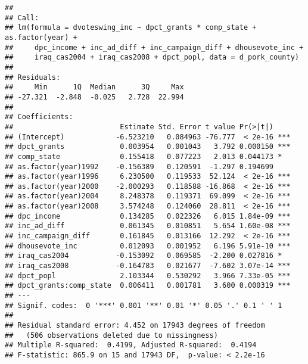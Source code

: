 \documentclass[
]{article}
\begin{document}
\begin{verbatim}
## 
## Call:
## lm(formula = dvoteswing_inc ~ dpct_grants * comp_state + as.factor(year) + 
##     dpc_income + inc_ad_diff + inc_campaign_diff + dhousevote_inc + 
##     iraq_cas2004 + iraq_cas2008 + dpct_popl, data = d_pork_county)
## 
## Residuals:
##     Min      1Q  Median      3Q     Max 
## -27.321  -2.848  -0.025   2.728  22.994 
## 
## Coefficients:
##                         Estimate Std. Error t value Pr(>|t|)    
## (Intercept)            -6.523210   0.084963 -76.777  < 2e-16 ***
## dpct_grants             0.003954   0.001043   3.792 0.000150 ***
## comp_state              0.155418   0.077223   2.013 0.044173 *  
## as.factor(year)1992    -0.156389   0.120591  -1.297 0.194699    
## as.factor(year)1996     6.230500   0.119533  52.124  < 2e-16 ***
## as.factor(year)2000    -2.000293   0.118588 -16.868  < 2e-16 ***
## as.factor(year)2004     8.248378   0.119371  69.099  < 2e-16 ***
## as.factor(year)2008     3.574248   0.124060  28.811  < 2e-16 ***
## dpc_income              0.134285   0.022326   6.015 1.84e-09 ***
## inc_ad_diff             0.061345   0.010851   5.654 1.60e-08 ***
## inc_campaign_diff       0.161845   0.013166  12.292  < 2e-16 ***
## dhousevote_inc          0.012093   0.001952   6.196 5.91e-10 ***
## iraq_cas2004           -0.153092   0.069585  -2.200 0.027816 *  
## iraq_cas2008           -0.164783   0.021677  -7.602 3.07e-14 ***
## dpct_popl               2.103344   0.530292   3.966 7.33e-05 ***
## dpct_grants:comp_state  0.006411   0.001781   3.600 0.000319 ***
## ---
## Signif. codes:  0 '***' 0.001 '**' 0.01 '*' 0.05 '.' 0.1 ' ' 1
## 
## Residual standard error: 4.452 on 17943 degrees of freedom
##   (506 observations deleted due to missingness)
## Multiple R-squared:  0.4199, Adjusted R-squared:  0.4194 
## F-statistic: 865.9 on 15 and 17943 DF,  p-value: < 2.2e-16
\end{verbatim}
\end{document}
